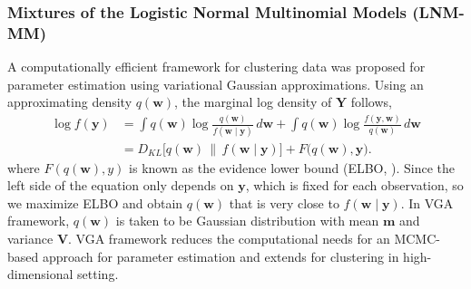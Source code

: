 \documentclass[]{report}
\theoremstyle{definition}
\begin{document}
\subsubsection{Mixtures of the Logistic Normal Multinomial Models (LNM-MM)}
A computationally efficient framework for clustering data was proposed for parameter estimation using variational Gaussian approximations. Using an approximating density $q(\boldsymbol{w})$, the marginal log density of $\boldsymbol{Y}$ follows,
\begin{align}
\log f(\boldsymbol{y})
&= \int q(\boldsymbol{w}) \log \frac{q(\boldsymbol{w})}{f(\boldsymbol{w}\mid \boldsymbol{y})}\, d\boldsymbol{w}
 + \int q(\boldsymbol{w}) \log \frac{f(\boldsymbol{y}, \boldsymbol{w})}{q(\boldsymbol{w})}\, d\boldsymbol{w} \\
&= D_{KL}\!\bigl[q(\boldsymbol{w}) \,\|\, f(\boldsymbol{w}\mid \boldsymbol{y})\bigr]
 + F\bigl(q(\boldsymbol{w}), \boldsymbol{y}\bigr).
\end{align}
where $F(q(\boldsymbol{w}),y)$ is known as the evidence lower bound (ELBO, \cite{Blei03042017}). Since the left side of the equation only depends on $\boldsymbol{y}$, which is fixed for each observation, so we maximize ELBO and obtain $q(\boldsymbol{w})$ that is very close to $f(\boldsymbol{w}\mid \boldsymbol{y})$.  In VGA framework, $q(\boldsymbol{w})$ is taken to be Gaussian distribution with mean $\boldsymbol{m}$ and variance $\boldsymbol{V}$. VGA framework reduces the computational needs for an MCMC-based approach for parameter estimation and extends for clustering in high-dimensional setting.
\end{document}
